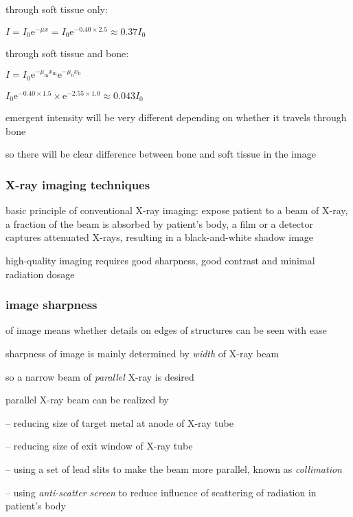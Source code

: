 \sol through soft tissue only:

{
	\centering
	
	$ I = I_0 \mathrm{e}^{-\mu x} = I_0 \mathrm{e}^{-0.40\times2.5} \approx 0.37 I_0$
	
}

through soft tissue and bone:

{
	\centering
	
	$ I = I_0 \mathrm{e}^{-\mu_\text{m} x_\text{m}} \mathrm{e}^{-\mu_\text{b} x_\text{b}}$
	
	$I_0 \mathrm{e}^{-0.40\times1.5} \times \mathrm{e}^{-2.55\times1.0}  \approx 0.043 I_0$
	
}

emergent intensity will be very different depending on whether it travels through bone

so there will be clear difference between bone and soft tissue in the image \eoe



\subsubsection{X-ray imaging techniques}

basic principle of conventional X-ray imaging: expose patient to a beam of X-ray, a fraction of the beam is absorbed by patient's body, a film or a detector captures attenuated X-rays, resulting in a black-and-white shadow image

high-quality imaging requires good sharpness, good contrast and minimal radiation dosage

\subsubsection*{image sharpness}

 of image means whether details on edges of structures can be seen with ease
	
sharpness of image is mainly determined by \emph{width} of X-ray beam

so a narrow beam of \emph{parallel} X-ray is desired

\cmt parallel X-ray beam can be realized by

\begin{compactitem}
	\item[--] reducing size of target metal at anode of X-ray tube
	
	\item[--] reducing size of exit window of X-ray tube
	
	\item[--] using a set of lead slits to make the beam more parallel, known as \emph{collimation}
	
	\item[--] using \emph{anti-scatter screen} to reduce influence of scattering of radiation in patient's body

\end{compactitem}

